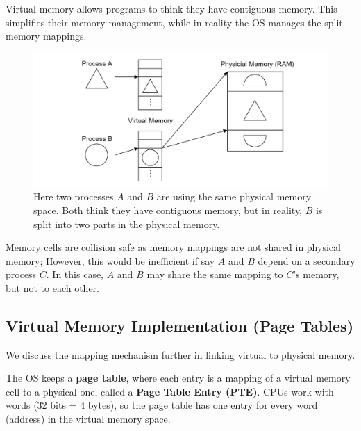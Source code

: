 \newpage
\begin{Def}

    Virtual memory allows programs to think they have contiguous memory. This simplifies their 
    memory management, while in reality the OS manages the split memory mappings.
\end{Def}

\begin{figure}[h]
    \centering
    \includegraphics[width=\textwidth]{Sections/virt/frag.png}
    
    \vspace{1em}
    \caption{Here two processes $A$ and $B$ are using the same physical memory space. Both think they have 
    contiguous memory, but in reality, $B$ is split into two parts in the physical memory.}
    
    \label{fig:virt3}
\end{figure}

\begin{Def}

    Memory cells are collision safe as memory mappings are not shared in physical memory; However, this would be 
    inefficient if say $A$ and $B$ depend on a secondary process $C$. In this case, $A$ and $B$ may share the same mapping to $C$'s memory, but not to each other.
\end{Def}

\subsection{Virtual Memory Implementation (Page Tables)}
\noindent
We discuss the mapping mechanism further in linking virtual to physical memory.
\begin{Def}

    The OS keeps a \textbf{page table}, where each entry is a mapping of a virtual memory cell to a physical one, called a \textbf{Page Table Entry (PTE)}.
    CPUs work with words (32 bits = 4 bytes), so the page table has one entry for every word (address) in the virtual memory space.
\end{Def}

